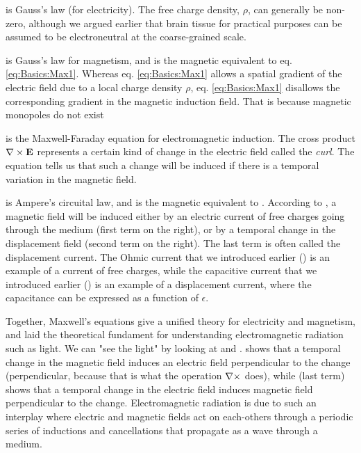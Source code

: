  is Gauss's law (for electricity). The free charge density, $\rho$, can generally be non-zero, although we argued earlier that brain tissue for practical purposes can be assumed to be electroneutral at the coarse-grained scale. 

 is Gauss's law for magnetism, and is the magnetic equivalent to eq. \ref{eq:Basics:Max1}. Whereas eq. \ref{eq:Basics:Max1} allows a spatial gradient of the electric field due to a local charge density $\rho$, eq. \ref{eq:Basics:Max1} disallows the corresponding gradient in the magnetic induction field. That is because magnetic monopoles do not exist

 is the Maxwell-Faraday equation for electromagnetic induction. The cross product ${\bf \nabla} \times {\bf E}$ represents a certain kind of change in the electric field called the \textit{curl}. The equation tells us that such a change will be induced if there is a temporal variation in the magnetic field. 

 is Ampere's circuital law, and is the magnetic equivalent to . According to , a magnetic field will be induced either by an electric current of free charges going through the medium (first term on the right), or by a temporal change in the displacement field (second term on the right). The last term is often called the displacement current. The Ohmic current that we introduced earlier () is an example of a current of free charges, while the capacitive current that we introduced earlier () is an example of a displacement current, where the capacitance can be expressed as a function of $\epsilon$. 

Together, Maxwell's equations give a unified theory for electricity and magnetism, and laid the theoretical fundament for understanding electromagnetic radiation such as light. We can "see the light" by looking at  and .  shows that a temporal change in the magnetic field induces an electric field perpendicular to the change (perpendicular, because that is what the operation ${\bf \nabla} \times$ does), while  (last term) shows that a temporal change in the electric field induces magnetic field perpendicular to the change. Electromagnetic radiation is due to such an interplay where electric and magnetic fields act on each-others  through a periodic series of inductions and cancellations that propagate as a wave through a medium. 

